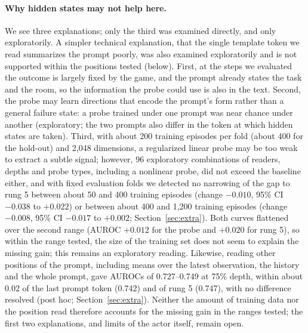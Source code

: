 \documentclass[11pt]{article}
\begin{document}
\paragraph{Why hidden states may not help here.} We see three explanations; only the third was examined directly, and only exploratorily. A simpler technical explanation, that the single template token we read summarizes the prompt poorly, was also examined exploratorily and is not supported within the positions tested (below). First, at the steps we evaluated the outcome is largely fixed by the game, and the prompt already states the task and the room, so the information the probe could use is also in the text.
Second, the probe may learn directions that encode the prompt's form rather than a general failure state: a probe trained under one prompt was near chance under another (exploratory; the two prompts also differ in the token at which hidden states are taken).
Third, with about 200 training episodes per fold (about 400 for the hold-out) and 2,048 dimensions, a regularized linear probe may be too weak to extract a subtle signal; however, 96 exploratory combinations of readers, depths and probe types, including a nonlinear probe, did not exceed the baseline either, and with fixed evaluation folds we detected no narrowing of the gap to rung 5 between about 50 and 400 training episodes (change $-0.010$, 95\% CI $-0.038$ to $+0.022$) or between about 400 and 1,200 training episodes (change $-0.008$, 95\% CI $-0.017$ to $+0.002$; Section~\ref{sec:extra}). Both curves flattened over the second range (AUROC $+0.012$ for the probe and $+0.020$ for rung 5), so within the range tested, the size of the training set does not seem to explain the missing gain; this remains an exploratory reading. Likewise, reading other positions of the prompt, including means over the latest observation, the history and the whole prompt, gave AUROCs of 0.727--0.749 at 75\% depth, within about 0.02 of the last prompt token (0.742) and of rung 5 (0.747), with no difference resolved (post hoc; Section~\ref{sec:extra}). Neither the amount of training data nor the position read therefore accounts for the missing gain in the ranges tested; the first two explanations, and limits of the actor itself, remain open.
\end{document}
